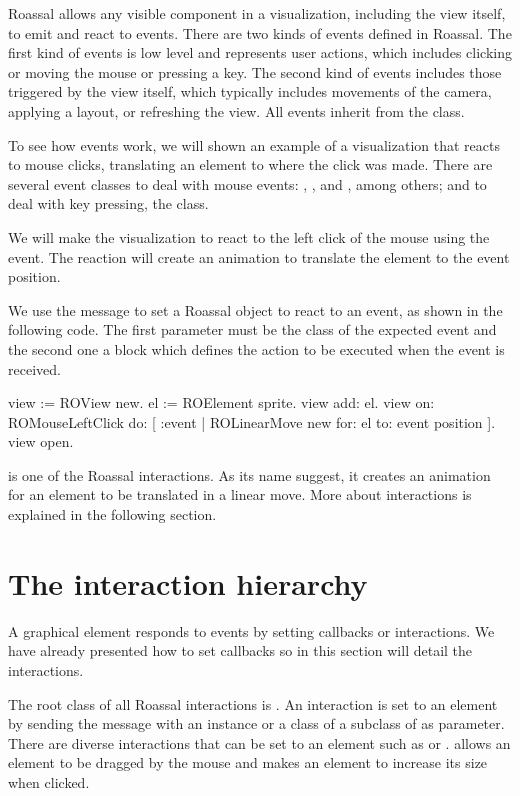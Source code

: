 \documentclass[a4paper,10pt,twoside]{book}
\begin{document}
Roassal allows any visible component in a visualization, including the view itself, to emit and react to events. There are two kinds of events defined in Roassal. The first kind of events is low level and represents user actions, which includes clicking or moving the mouse or pressing a key. The second kind of events includes those triggered by the view itself, which typically includes movements of the camera, applying a layout, or refreshing the view. All events inherit from the  class.

To see how events work, we will shown an example of a visualization that reacts to mouse clicks, translating an element to where the click was made. 
There are several event classes to deal with mouse events: , ,  and , among others; and to deal with key pressing, the  class.

We will make the visualization to react to the left click of the mouse using the  event. The reaction will create an animation to translate the element to the event position.

We use the  message to set a Roassal object to react to an event, as shown in the following code. The first parameter must be the class of the expected event and the second one a block which defines the action to be executed when the event is received.

\begin{code}{}
view := ROView new.
el := ROElement sprite.
view add: el.
view 
	on: ROMouseLeftClick 
	do: [ :event | ROLinearMove new for: el to: event position ].
view open. 
\end{code}


 is one of the Roassal interactions. As its name suggest, it creates an animation for an element to be translated in a linear move. More about interactions is explained in the following section.

\section{The interaction hierarchy} 

A graphical element responds to events by setting callbacks or interactions. We have already presented how to set callbacks so in this section will detail the interactions. 

The root class of all Roassal interactions is . An interaction is set to an element by sending the  message with an instance or a class of a subclass of  as parameter. There are diverse interactions that can be set to an element such as    or .
 allows an element to be dragged by the mouse and  makes an element to increase its size when clicked. 
\end{document}
